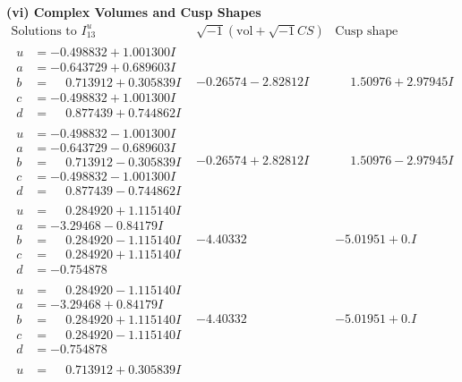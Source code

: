 \documentclass[1p]{elsarticle_modified}
\theoremstyle{definition}
\newcommand{\I}{\sqrt{-1}}
\begin{document}
\newpage\flushleft \textbf{(vi) Complex Volumes and Cusp Shapes}
$$\begin{array}{c|c|c}  
\text{Solutions to }I^u_{13}& \I (\text{vol} + \sqrt{-1}CS) & \text{Cusp shape}\\
 \hline 
\begin{aligned}
u &= -0.498832 + 1.001300 I \\
a &= -0.643729 + 0.689603 I \\
b &= \phantom{-}0.713912 + 0.305839 I \\
c &= -0.498832 + 1.001300 I \\
d &= \phantom{-}0.877439 + 0.744862 I\end{aligned}
 & -0.26574 - 2.82812 I & \phantom{-}1.50976 + 2.97945 I \\ \hline\begin{aligned}
u &= -0.498832 - 1.001300 I \\
a &= -0.643729 - 0.689603 I \\
b &= \phantom{-}0.713912 - 0.305839 I \\
c &= -0.498832 - 1.001300 I \\
d &= \phantom{-}0.877439 - 0.744862 I\end{aligned}
 & -0.26574 + 2.82812 I & \phantom{-}1.50976 - 2.97945 I \\ \hline\begin{aligned}
u &= \phantom{-}0.284920 + 1.115140 I \\
a &= -3.29468 - 0.84179 I \\
b &= \phantom{-}0.284920 - 1.115140 I \\
c &= \phantom{-}0.284920 + 1.115140 I \\
d &= -0.754878\phantom{ +0.000000I}\end{aligned}
 & -4.40332\phantom{ +0.000000I} & -5.01951 + 0. I\phantom{ +0.000000I} \\ \hline\begin{aligned}
u &= \phantom{-}0.284920 - 1.115140 I \\
a &= -3.29468 + 0.84179 I \\
b &= \phantom{-}0.284920 + 1.115140 I \\
c &= \phantom{-}0.284920 - 1.115140 I \\
d &= -0.754878\phantom{ +0.000000I}\end{aligned}
 & -4.40332\phantom{ +0.000000I} & -5.01951 + 0. I\phantom{ +0.000000I} \\ \hline\begin{aligned}
u &= \phantom{-}0.713912 + 0.305839 I \\

\end{aligned}
\end{array}$$
\end{document}
